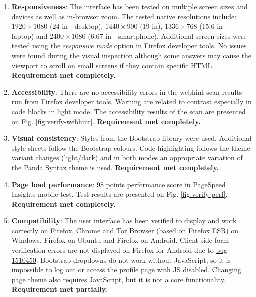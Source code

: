 \begin{enumerate}
	\item \textbf{Responsiveness}: The interface has been tested on multiple screen sizes and devices as well as in-browser zoom. The tested native resolutions include: $1920 \times 1080$ (24 in - desktop), $1440 \times 900$ (19 in), $1336 \times 768$ (15.6 in - laptop) and $2400 \times 1080$ (6.67 in - smartphone). Additional screen sizes were tested using the \textit{responsive mode} option in Firefox developer tools. No issues were found during the visual inspection although some answers may cause the viewport to scroll on small screens if they contain specific HTML. \textbf{Requirement met completely.}

	\item \textbf{Accessibility}: There are no accessibility errors in the webhint scan results run from Firefox developer tools. Warning are related to contrast especially in code blocks in light mode. The accessibility results of the scan are presented on Fig. \ref{fig:verify-webhint}. \textbf{Requirement met completely.}

	\item \textbf{Visual consistency}: Styles from the Bootstrap library were used. Additional style sheets follow the Bootstrap colours. Code highlighting follows the theme variant changes (light/dark) and in both modes an appropriate variation of the Panda Syntax theme is used. \textbf{Requirement met completely.}

	\item \textbf{Page load performance}: 98 points performance score in PageSpeed Insights mobile test. Test results are presented on Fig. \ref{fig:verify-perf}. \textbf{Requirement met completely.}

	\item \textbf{Compatibility}: The user interface has been verified to display and work correctly on Firefox, Chrome and Tor Browser (based on Firefox ESR) on Windows, Firefox on Ubuntu and Firefox on Android. Client-side form verification errors are not displayed on Firefox for Android due to \href{https://bugzilla.mozilla.org/show_bug.cgi?id=1510450}{bug 1510450}. Bootstrap dropdowns do not work without JavaScript, so it is impossible to log out or access the profile page with JS disabled. Changing page theme also requires JavaScript, but it is not a core functionality. \textbf{Requirement met partially.}
\end{enumerate}

